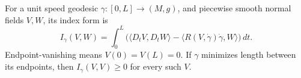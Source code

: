 For a unit speed geodesic \(\gamma:[0,L]\to(M,g)\), and piecewise smooth normal fields \(V,W\), its index form is
\[
I_\gamma(V,W)=\int_0^L\bigl(\langle D_tV,D_tW\rangle-\langle R(V,\dot\gamma)\dot\gamma,W\rangle\bigr)\,dt.
\]
Endpoint-vanishing means \(V(0)=V(L)=0\). If \(\gamma\) minimizes length between its endpoints, then \(I_\gamma(V,V)\ge0\) for every such \(V\).